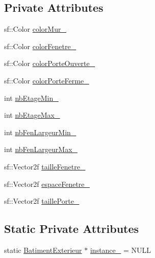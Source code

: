 \subsection*{Private Attributes}
\begin{DoxyCompactItemize}
\item 
sf\-::\-Color \hyperlink{classPropriete_1_1BatimentExterieur_a7523a785bb99875e7038bb87630f5c58}{color\-Mur\-\_\-}
\item 
sf\-::\-Color \hyperlink{classPropriete_1_1BatimentExterieur_a492ecfea288daf7efcac083b1438bc55}{color\-Fenetre\-\_\-}
\item 
sf\-::\-Color \hyperlink{classPropriete_1_1BatimentExterieur_afb0f32ba2f726b830e618e539b0f887c}{color\-Porte\-Ouverte\-\_\-}
\item 
sf\-::\-Color \hyperlink{classPropriete_1_1BatimentExterieur_a90b914503c502b03a45a11dc088347ab}{color\-Porte\-Ferme\-\_\-}
\item 
int \hyperlink{classPropriete_1_1BatimentExterieur_a62b079703fd94bd1ef19b96b8bf13ae2}{nb\-Etage\-Min\-\_\-}
\item 
int \hyperlink{classPropriete_1_1BatimentExterieur_ada235dbec45f759dd67709d0971c5007}{nb\-Etage\-Max\-\_\-}
\item 
int \hyperlink{classPropriete_1_1BatimentExterieur_aed63340f105b359fd1f51520ce83825f}{nb\-Fen\-Largeur\-Min\-\_\-}
\item 
int \hyperlink{classPropriete_1_1BatimentExterieur_ad9f633db2a820daa2afb4435929d34cb}{nb\-Fen\-Largeur\-Max\-\_\-}
\item 
sf\-::\-Vector2f \hyperlink{classPropriete_1_1BatimentExterieur_ad39b925ee0b514e4cf1ff27551ac5cce}{taille\-Fenetre\-\_\-}
\item 
sf\-::\-Vector2f \hyperlink{classPropriete_1_1BatimentExterieur_a56c720311dba939d5b68c9137e0c71e7}{espace\-Fenetre\-\_\-}
\item 
sf\-::\-Vector2f \hyperlink{classPropriete_1_1BatimentExterieur_af708f86509e6adad7f2230427cfa37c7}{taille\-Porte\-\_\-}
\end{DoxyCompactItemize}
\subsection*{Static Private Attributes}
\begin{DoxyCompactItemize}
\item 
static \hyperlink{classPropriete_1_1BatimentExterieur}{Batiment\-Exterieur} $\ast$ \hyperlink{classPropriete_1_1BatimentExterieur_ab9b7f913980cacd53cc25ac3dca8a3cc}{instance\-\_\-} = N\-U\-L\-L
\end{DoxyCompactItemize}
